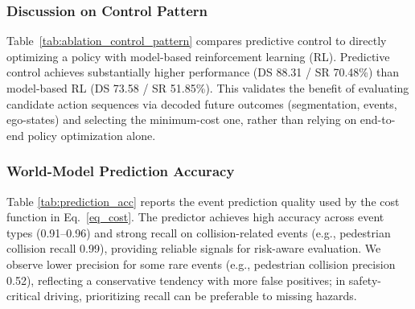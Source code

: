 \documentclass[twocolumn]{template}
\theoremstyle{thmstyleone}%
\theoremstyle{thmstyletwo}%
\theoremstyle{thmstylethree}%
\begin{document}
\subsubsection{Discussion on Control Pattern} 

Table~\ref{tab:ablation_control_pattern} compares predictive control to directly optimizing a policy with model-based reinforcement learning (RL).
Predictive control achieves substantially higher performance (DS 88.31 / SR 70.48\%) than model-based RL (DS 73.58 / SR 51.85\%).
This validates the benefit of evaluating candidate action sequences via decoded future outcomes (segmentation, events, ego-states) and selecting the minimum-cost one,
rather than relying on end-to-end policy optimization alone.

\begin{table}[t]
    \centering
    \setlength{\tabcolsep}{6pt}
    \caption{Ablation study on the control pattern with learned world model.}
    \label{tab:ablation_control_pattern}
\end{table}

\subsubsection{World-Model Prediction Accuracy}
Table \ref{tab:prediction_acc} reports the event prediction quality used by the cost function in Eq.~\eqref{eq_cost}.
The predictor achieves high accuracy across event types (0.91--0.96) and strong recall on collision-related events (e.g., pedestrian collision recall 0.99), providing reliable signals for risk-aware evaluation.
We observe lower precision for some rare events (e.g., pedestrian collision precision 0.52), reflecting a conservative tendency with more false positives; in safety-critical driving, prioritizing recall can be preferable to missing hazards.
\end{document}
